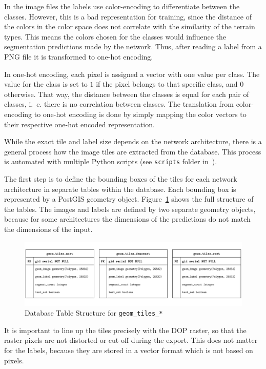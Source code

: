 In the image files the labels use color-encoding to differentiate between the classes. However, this is a bad representation for training, since the distance of the colors in the color space does not correlate with the similarity of the terrain types. This means the colors chosen for the classes would influence the segmentation predictions made by the network. Thus, after reading a label from a PNG file it is transformed to one-hot encoding.

In one-hot encoding, each pixel is assigned a vector with one value per class. The value for the class is set to $1$ if the pixel belongs to that specific class, and $0$ otherwise. That way, the distance between the classes is equal for each pair of classes, i.~e. there is no correlation between classes. The translation from color-encoding to one-hot encoding is done by simply mapping the color vectors to their respective one-hot encoded representation.

While the exact tile and label size depends on the network architecture, there is a general process how the image tiles are extracted from the database. This process is automated with multiple Python scripts (see \texttt{scripts} folder in~\cite{thesis-code20}).

The first step is to define the bounding boxes of the tiles for each network architecture in separate tables within the database. Each bounding box is represented by a  PostGIS geometry object. Figure~\ref{fig:geom_tiles_entities} shows the full structure of the tables. The images and labels are defined by two separate geometry objects, because for some architectures the dimensions of the predictions do not match the dimensions of the input.

\begin{figure}[h]
    \centering
    \includegraphics[width=\textwidth]{images/geom_tiles_entities}
    \caption{Database Table Structure for \texttt{geom\_tiles\_*}}
    \label{fig:geom_tiles_entities}
\end{figure}

It is important to line up the tiles precisely with the DOP raster, so that the raster pixels are not distorted or cut off during the export. This does not matter for the labels, because they are stored in a vector format which is not based on pixels.

